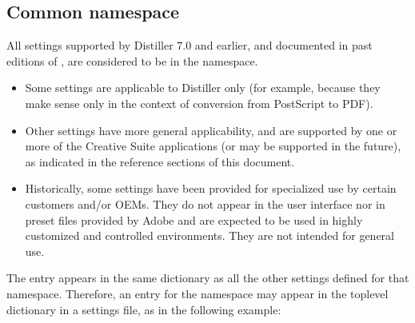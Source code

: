 \documentclass[letterpaper,12pt,english,openany,oneside]{sphinxmanual}
\begin{document}
\subsection{Common namespace}
\label{\detokenize{index:common-namespace}}
All settings supported by Distiller 7.0 and earlier, and documented in past editions of  , are considered to be in the  namespace.
\begin{itemize}
\item {} 
Some settings are applicable to Distiller only (for example, because they make sense only in the context of conversion from PostScript to PDF).

\item {} 
Other settings have more general applicability, and are supported by one or more of the Creative Suite applications (or may be supported in the future), as indicated in the reference sections of this document.

\item {} 
Historically, some settings have been provided for specialized use by certain customers and/or OEMs. They do not appear in the user interface nor in preset files provided by Adobe and are expected to be used in highly customized and controlled environments. They are not intended for general use.

\end{itemize}

The  entry appears in the same dictionary as all the other settings defined for that namespace. Therefore, an entry for the  namespace may appear in the top\sphinxhyphen{}level dictionary in a settings file, as in the following example:

\begin{sphinxVerbatim}[commandchars=\\\{\}]
          
          
          
          
          \PYG{p}{[}    \PYG{p}{]}
  
\end{sphinxVerbatim}
\end{document}
